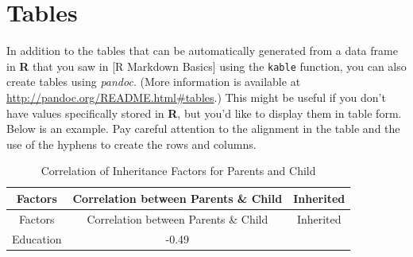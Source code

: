 \documentclass[12pt,twoside]{amherstthesis}
\begin{document}
  \section{Tables}\label{tables}
  
  In addition to the tables that can be automatically generated from a
  data frame in \textbf{R} that you saw in {[}R Markdown Basics{]} using
  the \texttt{kable} function, you can also create tables using
  \emph{pandoc}. (More information is available at
  \url{http://pandoc.org/README.html\#tables}.) This might be useful if
  you don't have values specifically stored in \textbf{R}, but you'd like
  to display them in table form. Below is an example. Pay careful
  attention to the alignment in the table and the use of the hyphens to
  create the rows and columns.
  
  \begin{longtable}[]{@{}ccc@{}}
  \caption{Correlation of Inheritance Factors for Parents and Child
  \label{tab:inher}}\tabularnewline
  \toprule
  \begin{minipage}[b]{0.29\columnwidth}\centering\strut
  Factors\strut
  \end{minipage} & \begin{minipage}[b]{0.47\columnwidth}\centering\strut
  Correlation between Parents \& Child\strut
  \end{minipage} & \begin{minipage}[b]{0.16\columnwidth}\centering\strut
  Inherited\strut
  \end{minipage}\tabularnewline
  \midrule
  \endfirsthead
  \toprule
  \begin{minipage}[b]{0.29\columnwidth}\centering\strut
  Factors\strut
  \end{minipage} & \begin{minipage}[b]{0.47\columnwidth}\centering\strut
  Correlation between Parents \& Child\strut
  \end{minipage} & \begin{minipage}[b]{0.16\columnwidth}\centering\strut
  Inherited\strut
  \end{minipage}\tabularnewline
  \midrule
  \endhead
  \begin{minipage}[t]{0.29\columnwidth}\centering\strut
  Education\strut
  \end{minipage} & \begin{minipage}[t]{0.47\columnwidth}\centering\strut
  -0.49\strut
  \end{minipage} & \begin{minipage}[t]{0.16\columnwidth}\centering\strut

\end{minipage}
\end{longtable}
\end{document}
